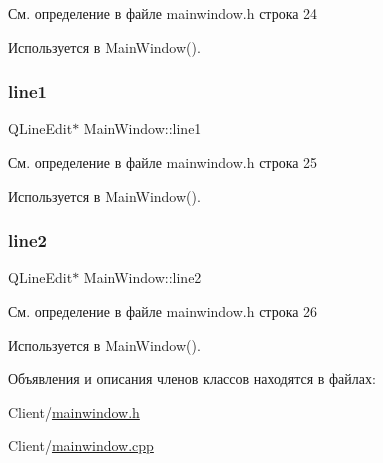 См. определение в файле mainwindow.\+h строка 24



Используется в Main\+Window().

\hypertarget{class_main_window_af08619c735ace803854d9f3fc6fdf4d2}{}\label{class_main_window_af08619c735ace803854d9f3fc6fdf4d2} 
\subsubsection{\texorpdfstring{line1}{line1}}
{\footnotesize\ttfamily Q\+Line\+Edit$\ast$ Main\+Window\+::line1\hspace{0.3cm}{\ttfamily [private]}}



См. определение в файле mainwindow.\+h строка 25



Используется в Main\+Window().

\hypertarget{class_main_window_a6bfac503123591b8bb31fd8e7dddd0c3}{}\label{class_main_window_a6bfac503123591b8bb31fd8e7dddd0c3} 
\subsubsection{\texorpdfstring{line2}{line2}}
{\footnotesize\ttfamily Q\+Line\+Edit$\ast$ Main\+Window\+::line2\hspace{0.3cm}{\ttfamily [private]}}



См. определение в файле mainwindow.\+h строка 26



Используется в Main\+Window().



Объявления и описания членов классов находятся в файлах\+:\begin{DoxyCompactItemize}
\item 
Client/\hyperlink{mainwindow_8h}{mainwindow.\+h}\item 
Client/\hyperlink{mainwindow_8cpp}{mainwindow.\+cpp}\end{DoxyCompactItemize}
